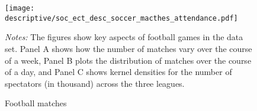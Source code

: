 \begin{figure}[H]\centering
	\texttt{[image: descriptive/soc\_ect\_desc\_soccer\_macthes\_attendance.pdf]}	
	\begin{minipage}{0.9\linewidth}
		\caption{Football matches}\label{fig_soc_ext:descriptives_matches_time_attendance}
		\scriptsize{\emph{Notes:} The figures show key aspects of football games in the data set. Panel A shows how the number of matches vary over the course of a week, Panel B plots the distribution of matches over the course of a day, and Panel C shows kernel densities for the number of spectators (in thousand) across the three leagues.}
	\end{minipage}
\end{figure}